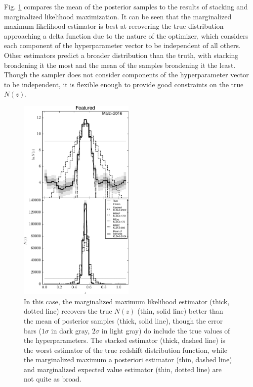 \documentclass[preprint]{aastex}
\begin{document}
Fig. \ref{fig:toy-comp} compares the mean of the posterior samples to the 
results of stacking and marginalized likelihood maximization.  It can be seen 
that the marginalized maximum likelihood estimator is best at recovering the 
true distribution approaching a delta function due to the nature of the 
optimizer, which considers each component of the hyperparameter vector to be 
independent of all others.  Other estimators predict a broader distribution 
than the truth, with stacking broadening it the most and the mean of the 
samples broadening it the least.  Though the sampler does not consider 
components of the hyperparameter vector to be independent, it is flexible 
enough to provide good constraints on the true $N(z)$.

\begin{figure}
\includegraphics[width=0.5\textwidth]{figs/delt/comps.pdf}
\caption{In this case, the marginalized maximum likelihood estimator (thick, 
dotted line) recovers the true $N(z)$ (thin, solid line) better than the mean 
of posterior samples (thick, solid line), though the error bars ($1\sigma$ in 
dark gray, $2\sigma$ in light gray) do include the true values of the 
hyperparameters.  The stacked estimator (thick, dashed line) is the worst 
estimator of the true redshift distribution function, while the marginalized 
maximum a posteriori estimator (thin, dashed line) and marginalized expected 
value estimator (thin, dotted line) are not quite as broad.}
\label{fig:toy-comp}
\end{figure}
\end{document}
